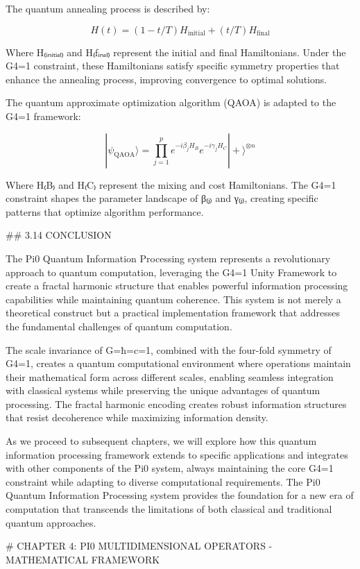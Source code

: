 The quantum annealing process is described by:

$$H(t) = (1-t/T)H_{\text{initial}} + (t/T)H_{\text{final}}$$

Where H₍ᵢₙᵢₜᵢₐₗ₎ and H₍fᵢₙₐₗ₎ represent the initial and final Hamiltonians. Under the G4=1 constraint, these Hamiltonians satisfy specific symmetry properties that enhance the annealing process, improving convergence to optimal solutions.

The quantum approximate optimization algorithm (QAOA) is adapted to the G4=1 framework:

$$|\psi_{\text{QAOA}}\rangle = \prod_{j=1}^{p} e^{-i\beta_j H_B} e^{-i\gamma_j H_C} |+\rangle^{\otimes n}$$

Where H₍B₎ and H₍C₎ represent the mixing and cost Hamiltonians. The G4=1 constraint shapes the parameter landscape of β₍ⱼ₎ and γ₍ⱼ₎, creating specific patterns that optimize algorithm performance.

## 3.14 CONCLUSION

The Pi0 Quantum Information Processing system represents a revolutionary approach to quantum computation, leveraging the G4=1 Unity Framework to create a fractal harmonic structure that enables powerful information processing capabilities while maintaining quantum coherence. This system is not merely a theoretical construct but a practical implementation framework that addresses the fundamental challenges of quantum computation.

The scale invariance of G=ħ=c=1, combined with the four-fold symmetry of G4=1, creates a quantum computational environment where operations maintain their mathematical form across different scales, enabling seamless integration with classical systems while preserving the unique advantages of quantum processing. The fractal harmonic encoding creates robust information structures that resist decoherence while maximizing information density.

As we proceed to subsequent chapters, we will explore how this quantum information processing framework extends to specific applications and integrates with other components of the Pi0 system, always maintaining the core G4=1 constraint while adapting to diverse computational requirements. The Pi0 Quantum Information Processing system provides the foundation for a new era of computation that transcends the limitations of both classical and traditional quantum approaches.

# CHAPTER 4: PI0 MULTIDIMENSIONAL OPERATORS - MATHEMATICAL FRAMEWORK


